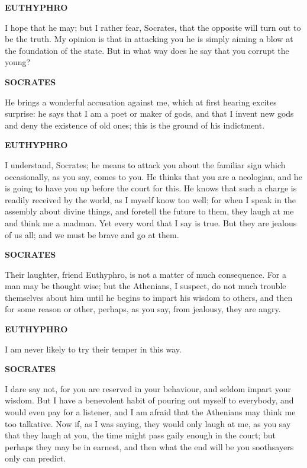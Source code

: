 \documentclass[11pt,letter]{article}
\begin{document}
\par \textbf{EUTHYPHRO}
\par   I hope that he may; but I rather fear, Socrates, that the opposite will turn out to be the truth. My opinion is that in attacking you he is simply aiming a blow at the foundation of the state. But in what way does he say that you corrupt the young?

\par \textbf{SOCRATES}
\par   He brings a wonderful accusation against me, which at first hearing excites surprise:  he says that I am a poet or maker of gods, and that I invent new gods and deny the existence of old ones; this is the ground of his indictment.

\par \textbf{EUTHYPHRO}
\par   I understand, Socrates; he means to attack you about the familiar sign which occasionally, as you say, comes to you. He thinks that you are a neologian, and he is going to have you up before the court for this. He knows that such a charge is readily received by the world, as I myself know too well; for when I speak in the assembly about divine things, and foretell the future to them, they laugh at me and think me a madman. Yet every word that I say is true. But they are jealous of us all; and we must be brave and go at them.

\par \textbf{SOCRATES}
\par   Their laughter, friend Euthyphro, is not a matter of much consequence. For a man may be thought wise; but the Athenians, I suspect, do not much trouble themselves about him until he begins to impart his wisdom to others, and then for some reason or other, perhaps, as you say, from jealousy, they are angry.

\par \textbf{EUTHYPHRO}
\par   I am never likely to try their temper in this way.

\par \textbf{SOCRATES}
\par   I dare say not, for you are reserved in your behaviour, and seldom impart your wisdom. But I have a benevolent habit of pouring out myself to everybody, and would even pay for a listener, and I am afraid that the Athenians may think me too talkative. Now if, as I was saying, they would only laugh at me, as you say that they laugh at you, the time might pass gaily enough in the court; but perhaps they may be in earnest, and then what the end will be you soothsayers only can predict.
\end{document}
